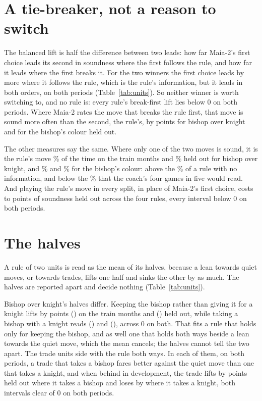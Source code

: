 \documentclass[11pt]{article}
\begin{document}
\RuleTable

\section{A tie-breaker, not a reason to switch}

The balanced lift is half the difference between two leads: how far Maia-2's first choice leads
its second in soundness where the first follows the rule, and how far it leads where the first
breaks it. For the two winners the first choice leads by more where it follows the rule, which is
the rule's information, but it leads in both orders, on both periods (Table~\ref{tab:units}). So
neither winner is worth switching to, and no rule is: every rule's break-first lift lies below 0 on
both periods. Where Maia-2 rates the move that breaks the rule first, that move is sound more often
than the second, the rule's, by \BkBfHeld{} points for bishop over knight and \ColBfHeld{} for the
bishop's colour held out.

The other measures say the same. Where only one of the two moves is sound, it is the rule's move
\BkOneTrain\% of the time on the train months and \BkOneHeld\% held out for bishop over knight, and
\ColOneTrain\% and \ColOneHeld\% for the bishop's colour: above the \NoInfoShare\% of a rule with
no information, and below the \CoachShare\% that the coach's four games in five would read. And
playing the rule's move in every split, in place of Maia-2's first choice, costs \AgainstLow{} to
\AgainstHigh{} points of soundness held out across the four rules, every interval below 0 on both
periods.

\section{The halves}

A rule of two units is read as the mean of its halves, because a lean towards quiet moves, or
towards trades, lifts one half and sinks the other by as much. The halves are reported apart and
decide nothing (Table~\ref{tab:units}).

Bishop over knight's halves differ. Keeping the bishop rather than giving it for a knight lifts by
\BfnTrain{} points (\BfnTrainCi) on the train months and \BfnHeld{} (\BfnHeldCi) held out, while
taking a bishop with a knight reads \NfbTrain{} (\NfbTrainCi) and \NfbHeld{} (\NfbHeldCi), across
0 on both. That fits a rule that holds only for keeping the bishop, and as well one that holds both
ways beside a lean towards the quiet move, which the mean cancels; the halves cannot tell the two
apart. The trade units side with the rule both ways. In each of them, on both periods, a trade
that takes a bishop fares better against the quiet move than one that takes a knight, and when
behind in development, the trade lifts by \BehindBishopHeld{} points held out where it takes a
bishop and loses by \BehindKnightHeld{} where it takes a knight, both intervals clear of 0 on both
periods.
\end{document}
